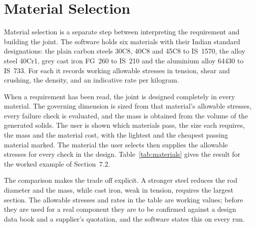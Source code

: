\section{Material Selection}
Material selection is a separate step between interpreting the requirement and building the joint. The software holds six materials with their Indian standard designations: the plain carbon steels 30C8, 40C8 and 45C8 to IS~1570, the alloy steel 40Cr1, grey cast iron FG~260 to IS~210 and the aluminium alloy 64430 to IS~733. For each it records working allowable stresses in tension, shear and crushing, the density, and an indicative rate per kilogram.

When a requirement has been read, the joint is designed completely in every material. The governing dimension is sized from that material's allowable stresses, every failure check is evaluated, and the mass is obtained from the volume of the generated solids. The user is shown which materials pass, the size each requires, the mass and the material cost, with the lightest and the cheapest passing material marked. The material the user selects then supplies the allowable stresses for every check in the design. Table~\ref{tab:materials} gives the result for the worked example of Section~7.2.



The comparison makes the trade off explicit. A stronger steel reduces the rod diameter and the mass, while cast iron, weak in tension, requires the largest section. The allowable stresses and rates in the table are working values; before they are used for a real component they are to be confirmed against a design data book and a supplier's quotation, and the software states this on every run.
